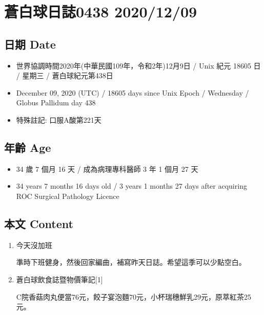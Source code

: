 \documentclass[a5paper, 11pt
]{book}
\providecommand{\tightlist}{%
  \setlength{\itemsep}{0pt}\setlength{\parskip}{0pt}}
\begin{document}
\hypertarget{ux84bcux767dux7403ux65e5ux8a8c0438-20201209}{%
\section{蒼白球日誌0438
2020/12/09}\label{ux84bcux767dux7403ux65e5ux8a8c0438-20201209}}

\hypertarget{ux65e5ux671f-date-8}{%
\subsection{日期 Date}\label{ux65e5ux671f-date-8}}

\begin{itemize}
\tightlist
\item
  世界協調時間2020年(中華民國109年，令和2年)12月9日 / Unix 紀元 18605 日
  / 星期三 / 蒼白球紀元第438日
\item
  December 09, 2020 (UTC) / 18605 days since Unix Epoch / Wednesday /
  Globus Pallidum day 438
\item
  特殊註記: 口服A酸第221天
\end{itemize}

\hypertarget{ux5e74ux9f61-age-8}{%
\subsection{年齡 Age}\label{ux5e74ux9f61-age-8}}

\begin{itemize}
\tightlist
\item
  34 歲 7 個月 16 天 / 成為病理專科醫師 3 年 1 個月 27 天
\item
  34 years 7 months 16 days old / 3 years 1 months 27 days after
  acquiring ROC Surgical Pathology Licence
\end{itemize}

\hypertarget{ux672cux6587-content-8}{%
\subsection{本文 Content}\label{ux672cux6587-content-8}}

\begin{enumerate}
\def\labelenumi{\arabic{enumi}.}
\item
  今天沒加班

  準時下班健身，然後回家編曲，補寫昨天日誌。希望這季可以少點空白。
\item
  蒼白球飲食誌暨物價筆記{[}1{]}

  C院香菇肉丸便當76元，餃子宴泡麵70元，小杯瑞穗鮮乳29元，原萃紅茶25元。
\end{enumerate}
\end{document}

